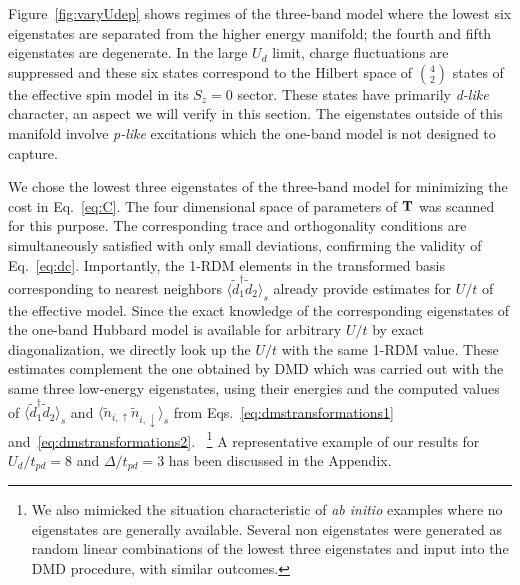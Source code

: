 \documentclass[aps, prb, 11pt]{revtex4-1}
\begin{document}
Figure~\ref{fig:varyUdep} shows regimes of the three-band model where 
the lowest six eigenstates are separated from the higher energy manifold; the 
fourth and fifth eigenstates are degenerate. 
In the large $U_d$ limit, charge fluctuations are suppressed and these six 
states correspond to the Hilbert space of $4 \choose 2$ states of the effective spin model in its $S_z=0$ sector.
These states have primarily \textit{d-like} character, an aspect we will verify in this section. 
The eigenstates outside of this manifold involve \textit{p-like} excitations which the one-band model is not designed 
to capture. 

We chose the lowest three eigenstates of the three-band model for minimizing 
the cost in Eq.~\eqref{eq:C}. The four dimensional space of parameters of ${\bf T}$ 
was scanned for this purpose. The corresponding trace and orthogonality conditions are simultaneously 
satisfied with only small deviations, confirming the validity of Eq.~\eqref{eq:dc}. 
Importantly, the 1-RDM elements in the transformed basis corresponding to nearest neighbors $\langle \tilde{d}_1^{\dagger} \tilde{d}_2 \rangle_s$ 
already provide estimates for $U/t$ of the effective model. Since the exact knowledge of the corresponding eigenstates of 
the one-band Hubbard model is available for arbitrary $U/t$ by exact diagonalization, we directly look up the $U/t$ with 
the same 1-RDM value. These estimates complement the one obtained by DMD which was carried out 
with the same three low-energy eigenstates, using their energies and 
the computed values of $\langle \tilde{d}_1^{\dagger} \tilde{d}_2 \rangle_s$ 
and $\langle \tilde{n}_{i,\uparrow} \tilde{n}_{i,\downarrow} \rangle_{s}$ from Eqs.~\eqref{eq:dmstransformations1} 
and~\eqref{eq:dmstransformations2}.
~\footnote{We also mimicked the situation characteristic of \textit{ab initio} 
examples where no eigenstates are generally available. Several non eigenstates were generated as random linear combinations of 
the lowest three eigenstates and input into the DMD procedure, with 
similar outcomes.}
A representative example of our results for $U_{d}/t_{pd}=8$ and $\Delta/t_{pd}=3$ 
has been discussed in the Appendix. 
\end{document}
